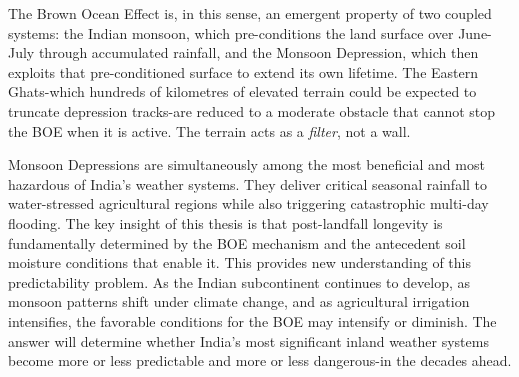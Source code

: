 The Brown Ocean Effect is, in this sense, an emergent property of two
coupled systems: the Indian monsoon, which pre-conditions the land surface
over June-July through accumulated rainfall, and the Monsoon Depression,
which then exploits that pre-conditioned surface to extend its own lifetime.
The Eastern Ghats-which hundreds of kilometres of elevated terrain could be
expected to truncate depression tracks-are reduced to a moderate obstacle
that cannot stop the BOE when it is active. The terrain acts as a \emph{filter},
not a wall.

Monsoon Depressions are simultaneously among the most beneficial and
most hazardous of India's weather systems. They deliver critical
seasonal rainfall to water-stressed agricultural regions while also
triggering catastrophic multi-day flooding. The key insight of this
thesis is that post-landfall longevity is fundamentally determined by
the BOE mechanism and the antecedent soil moisture conditions that
enable it. This provides new understanding of this predictability problem.
As the Indian subcontinent continues to develop, as monsoon patterns
shift under climate change, and as agricultural irrigation
intensifies, the favorable conditions for the BOE may intensify or
diminish. The answer will determine whether India's most significant
inland weather systems become more or less predictable and more or
less dangerous-in the decades ahead.
